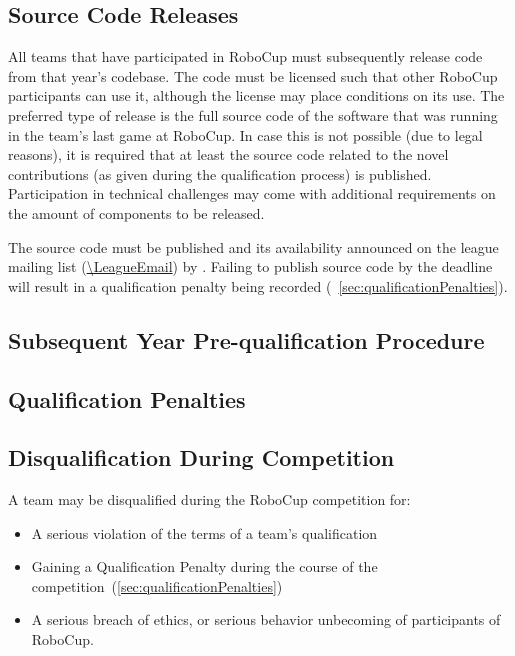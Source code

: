 \subsection{Source Code Releases}
\label{sec:code_release}

All teams that have participated in RoboCup must subsequently release code from that year's codebase.
The code must be licensed such that other RoboCup participants can use it, although the license may place conditions on its use.
The preferred type of release is the full source code of the software that was running in the team's last game at RoboCup.
In case this is not possible (\eg due to legal reasons), it is required that at least the source code related to the novel contributions (as given during the qualification process) is published.
Participation in technical challenges may come with additional requirements on the amount of components to be released.

The source code must be published and its availability announced on the league mailing list (\url{\LeagueEmail}) by \DTMdate{\CodeReleaseAnnouncementDate}.
Failing to publish source code by the deadline will result in a qualification penalty being recorded (\cf~\cref{sec:qualificationPenalties}).


\subsection{Subsequent Year Pre-qualification Procedure}
\label{sec:pre_qualification}

\subsection{Qualification Penalties}
\label{sec:qualification_penalties}

\subsection{Disqualification During Competition}
\label{sec:disqualification_during_competition}

A team may be disqualified during the RoboCup competition for:
\begin{itemize}
  \item A serious violation of the terms of a team's qualification
  \item Gaining a Qualification Penalty during the course of the competition~(\cf \cref{sec:qualificationPenalties})
  \item A serious breach of ethics, or serious behavior unbecoming of participants of RoboCup.
\end{itemize}

